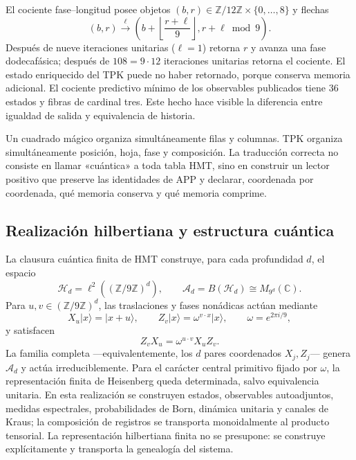 El cociente fase--longitud posee objetos $(b,r)\in\mathbb Z/12\mathbb Z
\times\{0,\ldots,8\}$ y flechas
\[
 (b,r)\xrightarrow{\ell}
 \left(b+\left\lfloor\frac{r+\ell}{9}\right\rfloor,
       r+\ell\bmod9\right).
 \tag{GMC-2.11}
\]
Después de nueve iteraciones unitarias ($\ell=1$) retorna $r$ y avanza una fase
dodecafásica; después de $108=9\cdot12$ iteraciones unitarias retorna el cociente.
El estado enriquecido del TPK puede no
haber retornado, porque conserva memoria adicional. El cociente predictivo
mínimo de los observables publicados tiene 36 estados y fibras de cardinal
tres. Este hecho hace visible la diferencia entre igualdad de salida y
equivalencia de historia.

\begin{intuitionbox}
Un cuadrado mágico organiza simultáneamente filas y columnas. TPK organiza
simultáneamente posición, hoja, fase y composición. La traducción correcta no
consiste en llamar «cuántica» a toda tabla HMT, sino en construir un lector
positivo que preserve las identidades de APP y declarar, coordenada por
coordenada, qué memoria conserva y qué memoria comprime.
\end{intuitionbox}

\subsection{Realización hilbertiana y estructura cuántica}

La clausura cuántica finita de HMT construye, para cada profundidad
$d$, el espacio
\[
 \mathcal H_d=\ell^2((\mathbb Z/9\mathbb Z)^d),
 \qquad
 \mathcal A_d=B(\mathcal H_d)\cong M_{9^d}(\mathbb C).
 \tag{GMC-2.12}
\]
Para $u,v\in(\mathbb Z/9\mathbb Z)^d$, las traslaciones y fases nonádicas
actúan mediante
\[
 X_u|x\rangle=|x+u\rangle,
 \qquad
 Z_v|x\rangle=\omega^{v\cdot x}|x\rangle,
 \qquad \omega=e^{2\pi i/9},
\]
y satisfacen
\[
 Z_vX_u=\omega^{u\cdot v}X_uZ_v.
\]
La familia completa ---equivalentemente, los $d$ pares coordenados
$X_j,Z_j$--- genera $\mathcal A_d$ y actúa irreduciblemente. Para el carácter
central primitivo fijado por $\omega$, la representación finita de Heisenberg
queda determinada, salvo equivalencia unitaria. En esta realización se
construyen estados, observables autoadjuntos, medidas
espectrales, probabilidades de Born, dinámica unitaria y canales de Kraus; la
composición de registros se transporta monoidalmente al producto tensorial.
La representación hilbertiana finita no se presupone: se construye
explícitamente y transporta la genealogía del sistema.

